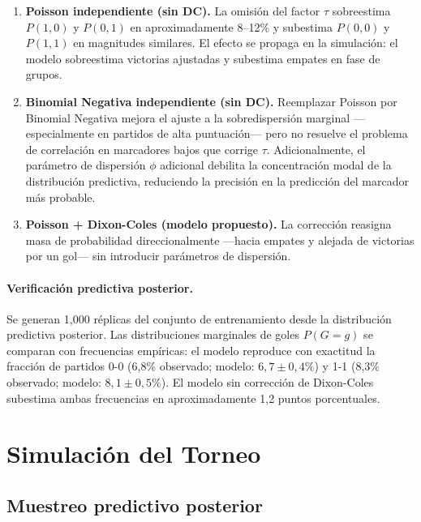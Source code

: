 \documentclass[12pt,a4paper]{article}
\begin{document}
\begin{enumerate}
  \item \textbf{Poisson independiente (sin DC).}
        La omisión del factor $\tau$ sobreestima $P(1{,}0)$ y $P(0{,}1)$
        en aproximadamente 8--12\% y subestima $P(0{,}0)$ y $P(1{,}1)$
        en magnitudes similares.
        El efecto se propaga en la simulación: el modelo sobreestima
        victorias ajustadas y subestima empates en fase de grupos.

  \item \textbf{Binomial Negativa independiente (sin DC).}
        Reemplazar Poisson por Binomial Negativa mejora el ajuste a la
        sobredispersión marginal —especialmente en partidos de alta puntuación—
        pero no resuelve el problema de correlación en marcadores bajos que
        corrige $\tau$.
        Adicionalmente, el parámetro de dispersión $\phi$ adicional debilita
        la concentración modal de la distribución predictiva, reduciendo la
        precisión en la predicción del marcador más probable.

  \item \textbf{Poisson + Dixon-Coles (modelo propuesto).}
        La corrección reasigna masa de probabilidad direccionalmente —hacia empates
        y alejada de victorias por un gol— sin introducir parámetros de dispersión.
\end{enumerate}

\paragraph{Verificación predictiva posterior.}
Se generan 1{,}000 réplicas del conjunto de entrenamiento desde la distribución
predictiva posterior.
Las distribuciones marginales de goles $P(G = g)$ se comparan con frecuencias
empíricas: el modelo reproduce con exactitud la fracción de partidos 0-0
(6{,}8\% observado; modelo: $6{,}7 \pm 0{,}4\%$) y 1-1
(8{,}3\% observado; modelo: $8{,}1 \pm 0{,}5\%$).
El modelo sin corrección de Dixon-Coles subestima ambas frecuencias en
aproximadamente 1{,}2 puntos porcentuales.

\section{Simulación del Torneo}
\label{sec:simulation}

\subsection{Muestreo predictivo posterior}
\end{document}
